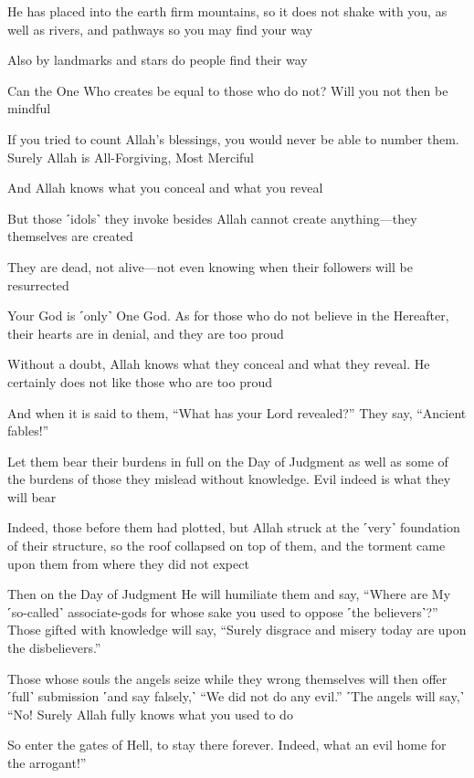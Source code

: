 He has placed into the earth firm mountains, so it does not shake with you, as well as rivers, and pathways so you may find your way

Also by landmarks and stars do people find their way

Can the One Who creates be equal to those who do not? Will you not then be mindful

If you tried to count Allah’s blessings, you would never be able to number them. Surely Allah is All-Forgiving, Most Merciful

And Allah knows what you conceal and what you reveal

But those ˹idols˺ they invoke besides Allah cannot create anything—they themselves are created

They are dead, not alive—not even knowing when their followers will be resurrected

Your God is ˹only˺ One God. As for those who do not believe in the Hereafter, their hearts are in denial, and they are too proud

Without a doubt, Allah knows what they conceal and what they reveal. He certainly does not like those who are too proud

And when it is said to them, “What has your Lord revealed?” They say, “Ancient fables!”

Let them bear their burdens in full on the Day of Judgment as well as some of the burdens of those they mislead without knowledge. Evil indeed is what they will bear

Indeed, those before them had plotted, but Allah struck at the ˹very˺ foundation of their structure, so the roof collapsed on top of them, and the torment came upon them from where they did not expect

Then on the Day of Judgment He will humiliate them and say, “Where are My ˹so-called˺ associate-gods for whose sake you used to oppose ˹the believers˺?” Those gifted with knowledge will say, “Surely disgrace and misery today are upon the disbelievers.”

Those whose souls the angels seize while they wrong themselves will then offer ˹full˺ submission ˹and say falsely,˺ “We did not do any evil.” ˹The angels will say,˺ “No! Surely Allah fully knows what you used to do

So enter the gates of Hell, to stay there forever. Indeed, what an evil home for the arrogant!”

